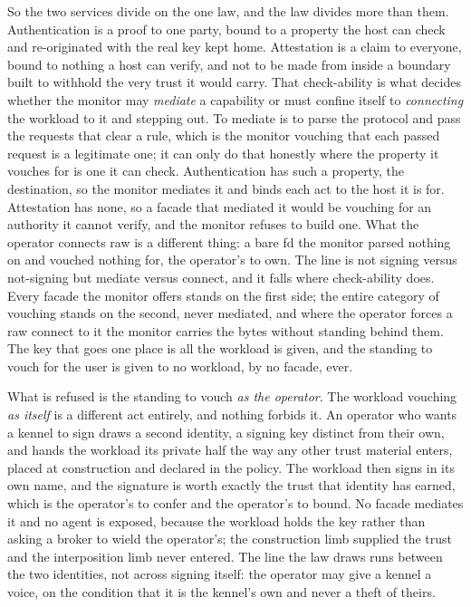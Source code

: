 So the two services divide on the one law, and the law divides more than
them. Authentication is a proof to one party, bound to a property the
host can check and re-originated with the real key kept home.
Attestation is a claim to everyone, bound to nothing a host can verify,
and not to be made from inside a boundary built to withhold the very
trust it would carry. That check-ability is what decides whether the
monitor may \emph{mediate} a capability or must confine itself to
\emph{connecting} the workload to it and stepping out. To mediate is to
parse the protocol and pass the requests that clear a rule, which is the
monitor vouching that each passed request is a legitimate one; it can
only do that honestly where the property it vouches for is one it can
check. Authentication has such a property, the destination, so the
monitor mediates it and binds each act to the host it is for.
Attestation has none, so a facade that mediated it would be vouching for
an authority it cannot verify, and the monitor refuses to build one.
What the operator connects raw is a different thing: a bare fd the
monitor parsed nothing on and vouched nothing for, the operator's to
own. The line is not signing versus not-signing but mediate versus
connect, and it falls where check-ability does. Every facade the monitor
offers stands on the first side; the entire category of vouching stands
on the second, never mediated, and where the operator forces a raw
connect to it the monitor carries the bytes without standing behind
them. The key that goes one place is all the workload is given, and the
standing to vouch for the user is given to no workload, by no facade,
ever.

What is refused is the standing to vouch \emph{as the operator}. The
workload vouching \emph{as itself} is a different act entirely, and
nothing forbids it. An operator who wants a kennel to sign draws a
second identity, a signing key distinct from their own, and hands the
workload its private half the way any other trust material enters,
placed at construction and declared in the policy. The workload then
signs in its own name, and the signature is worth exactly the trust that
identity has earned, which is the operator's to confer and the
operator's to bound. No facade mediates it and no agent is exposed,
because the workload holds the key rather than asking a broker to wield
the operator's; the construction limb supplied the trust and the
interposition limb never entered. The line the law draws runs between
the two identities, not across signing itself: the operator may give a
kennel a voice, on the condition that it is the kennel's own and never a
theft of theirs.

